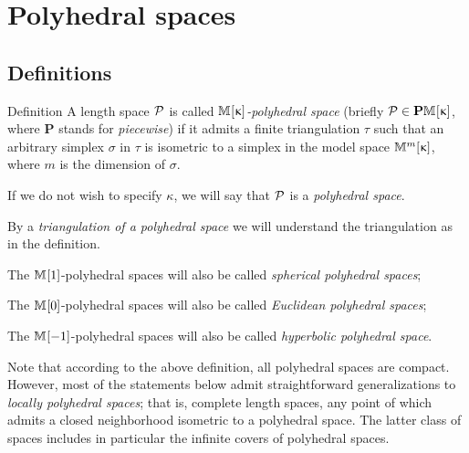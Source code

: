\chapter{Polyhedral spaces}

\section{Definitions}

\begin{thm}{Definition}\label{def:poly}
A length space $\mathcal{P}$ is called  
\emph{$\mathbb{M}_{{}}^{}[{\upkappa}]$-polyhedral space} (briefly $\spc{P}\in \PM{}\kappa$, where $\mathbf{P}$ stands for \emph{piecewise})
if it admits a finite triangulation $\tau$ 
such that an arbitrary simplex $\sigma$ in $\tau$ is isometric to a simplex in the model space $\mathbb{M}_{{}}^{m}[{\upkappa}]$, 
where $m$ is the dimension of $\sigma$.

If we do not wish to specify $\kappa$, we will say that $\mathcal{P}$ is a \emph{polyhedral space}.

By a 
\emph{triangulation of a polyhedral space} 
we will understand the triangulation as in the definition. 

\begin{subthm}{}
The $\mathbb{M}_{{}}^{}[{1}]$-polyhedral spaces will also be 
called 
\emph{spherical polyhedral spaces};
\end{subthm}

\begin{subthm}{}
The $\mathbb{M}_{{}}^{}[{0}]$-polyhedral spaces will also be 
called 
\emph{Euclidean polyhedral spaces};
\end{subthm}

\begin{subthm}{}
The $\mathbb{M}_{{}}^{}[{-1}]$-polyhedral spaces will also be 
called 
\emph{hyperbolic polyhedral space}.
\end{subthm}
\end{thm}

Note that according to the above definition,
all polyhedral spaces are compact.
However, 
most of the statements below admit straightforward generalizations 
to \emph{locally polyhedral spaces};
that is, complete length spaces,  
any point of which admits a closed neighborhood isometric to a polyhedral space.
The latter class of spaces includes in particular the infinite covers of polyhedral spaces.

